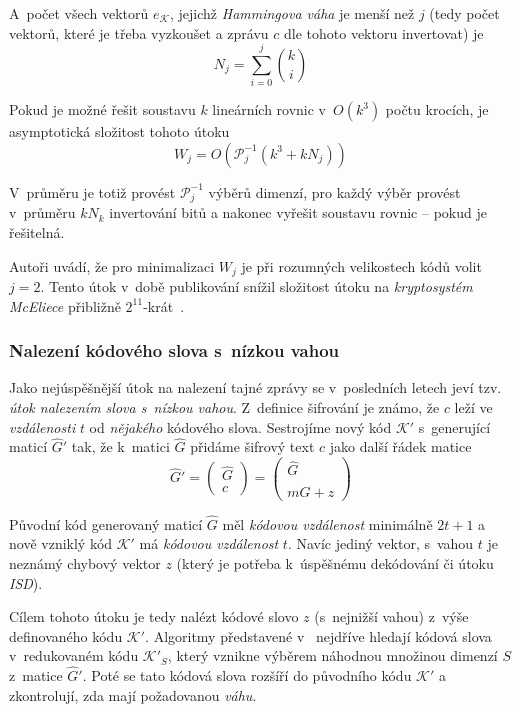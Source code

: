 \documentclass[thesis=M,czech,hidelinks]{FITthesis}[2012/06/26]
\newcommand{\0}{{\textcolor[gray]{0.80}{0}}}
\begin{document}
A~počet všech vektorů $e_\mathcal{K}$, jejichž \emph{Hammingova váha} je menší
než $j$ (tedy počet vektorů, které je třeba vyzkoušet a zprávu $c$ dle tohoto
vektoru invertovat) je
$$ N_j = \sum_{i=0}^{j}\binom{k}{i} $$

Pokud je možné řešit soustavu $k$ lineárních rovnic v~$O(k^3)$ počtu krocích, je
asymptotická složitost tohoto útoku
$$ W_j = O\left( \mathcal{P}_{j}^{-1}\left(k^3 + k N_j \right) \right) $$

V~průměru je totiž provést $\mathcal{P}_{j}^{-1}$ výběrů dimenzí, pro každý
výběr provést v~průměru $k N_k$ invertování bitů a nakonec vyřešit soustavu
rovnic -- pokud je řešitelná.

Autoři uvádí, že pro minimalizaci $W_j$ je při rozumných velikostech kódů volit
$j=2$. Tento útok v~době publikování snížil složitost útoku na
\emph{kryptosystém McEliece} přibližně $2^11$-krát~\cite{Lee}.

\subsubsection{Nalezení kódového slova s~nízkou vahou}

Jako nejúspěšnější útok na nalezení tajné zprávy se v~posledních letech jeví
tzv. \emph{útok nalezením slova s~nízkou vahou}. Z~definice šifrování je známo,
že $c$ leží ve \emph{vzdálenosti} $t$ od \emph{nějakého} kódového slova.
Sestrojíme nový kód $\mathcal{K}'$ s~generující maticí $\hat{G}'$ tak, že
k~matici $\hat{G}$ přidáme šifrový text $c$ jako další řádek matice
$$
    \hat{G}' = \left(\begin{array}{c}
        \hat{G} \\
        c
    \end{array}\right) = \left(\begin{array}{c}
        \hat{G} \\
        m\hat{G} + z
    \end{array}\right)
$$

Původní kód generovaný maticí $\hat{G}$ měl \emph{kódovou vzdálenost} minimálně
$2t+1$ a nově vzniklý kód $\mathcal{K}'$ má \emph{kódovou vzdálenost} $t$. Navíc
jediný vektor, s~vahou $t$ je neznámý chybový vektor $z$ (který je potřeba
k~úspěšnému dekódování či útoku \emph{ISD}).

Cílem tohoto útoku je tedy nalézt kódové slovo $z$ (s~nejnižší vahou) z~výše
definovaného kódu $\mathcal{K}'$. Algoritmy představené
v~\cite{Leon,Stern,Canteaut} nejdříve hledají kódová slova v~redukovaném kódu
$\mathcal{K}'_S$, který vznikne výběrem náhodnou množinou dimenzí $S$ z~matice
$\hat{G}'$. Poté se tato kódová slova rozšíří do původního kódu $\mathcal{K}'$ a
zkontrolují, zda mají požadovanou \emph{váhu}.
\end{document}
